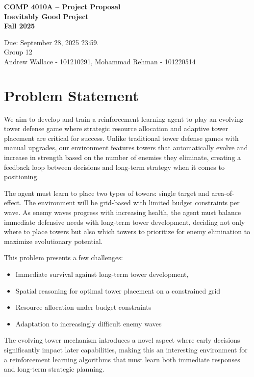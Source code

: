\documentclass[12pt]{article}
\begin{document}
 

\begin{center} \Large\bf
COMP 4010A -- Project Proposal\\
Inevitably Good Project \\
Fall 2025
\end{center} 

\begin{center}
Due: September 28, 2025 23:59. \\
Group 12 \\
Andrew Wallace - 101210291, 
Mohammad Rehman - 101220514
\end{center}

\section{Problem Statement}
We aim to develop and train a reinforcement learning agent to play an evolving tower defense game where strategic resource allocation and adaptive tower placement are critical for success. Unlike traditional tower defense games with manual upgrades, our environment features towers that automatically evolve and increase in strength based on the number of enemies they eliminate, creating a feedback loop between decisions and long-term strategy when it comes to positioning.\par
The agent must learn to place two types of towers: single target and area-of-effect. The environment will be grid-based with limited budget constraints per wave. As enemy waves progress with increasing health, the agent must balance immediate defensive needs with long-term tower development, deciding not only where to place towers but also which towers to prioritize for enemy elimination to maximize evolutionary potential.\par

This problem presents a few challenges: 
\begin{itemize}
    \item Immediate survival against long-term tower development,
    \item Spatial reasoning for optimal tower placement on a constrained grid
    \item Resource allocation under budget constraints
    \item Adaptation to increasingly difficult enemy waves
\end{itemize}
The evolving tower mechanism introduces a novel aspect where early decisions significantly impact later capabilities, making this an interesting environment for a reinforcement learning algorithms that must learn both immediate responses and long-term strategic planning.
\end{document}
